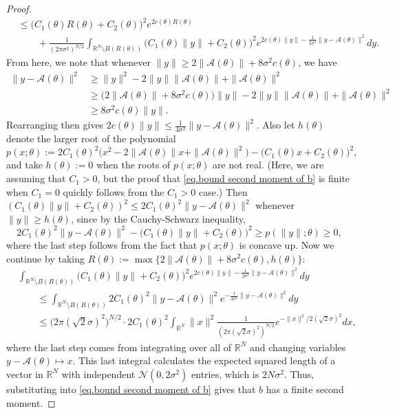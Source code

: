 \documentclass[times,10pt]{elsarticle}
\theoremstyle{plain}
\begin{document}
\begin{proof}
\begin{align}
\nonumber
&\leq \Big(C_1(\theta)R(\theta)+C_2(\theta)\Big)^2e^{2c(\theta)R(\theta)}\\
\label{eq.bound second moment of b}
&\qquad+\frac{1}{(2\pi \sigma^2)^{N/2}}\int_{\mathbb{R}^N\setminus B(R(\theta))}\Big(C_1(\theta)\|y\|+C_2(\theta)\Big)^2e^{2c(\theta)\|y\|-\frac{1}{2\sigma^2}\|y-\mathcal{A}(\theta)\|^2}dy.
\end{align}
From here, we note that whenever $\|y\|\geq 2\|\mathcal{A}(\theta)\|+8\sigma^2c(\theta)$, we have
\begin{align*}
\|y-\mathcal{A}(\theta)\|^2
&\geq\|y\|^2-2\|y\|\|\mathcal{A}(\theta)\|+\|\mathcal{A}(\theta)\|^2\\
&\geq\Big(2\|\mathcal{A}(\theta)\|+8\sigma^2c(\theta)\Big)\|y\|-2\|y\|\|\mathcal{A}(\theta)\|+\|\mathcal{A}(\theta)\|^2\\
&\geq8\sigma^2c(\theta)\|y\|.
\end{align*}
Rearranging then gives $2c(\theta)\|y\|\leq\frac{1}{4\sigma^2}\|y-\mathcal{A}(\theta)\|^2$.
Also let $h(\theta)$ denote the larger root of the polynomial
\begin{equation*}
p(x;\theta):=2C_1(\theta)^2\Big(x^2-2\|\mathcal{A}(\theta)\|x+\|\mathcal{A}(\theta)\|^2\Big)-\Big(C_1(\theta)x+C_2(\theta)\Big)^2,
\end{equation*}
and take $h(\theta):=0$ when the roots of $p(x;\theta)$ are not real.
(Here, we are assuming that $C_1>0$, but the proof that \eqref{eq.bound second moment of b} is finite when $C_1=0$ quickly follows from the $C_1>0$ case.)
Then $(C_1(\theta)\|y\|+C_2(\theta))^2\leq 2C_1(\theta)^2\|y-\mathcal{A}(\theta)\|^2$ whenever $\|y\|\geq h(\theta)$, since by the Cauchy-Schwarz inequality,
\begin{equation*}
2C_1(\theta)^2\|y-\mathcal{A}(\theta)\|^2-\Big(C_1(\theta)\|y\|+C_2(\theta)\Big)^2
\geq p(\|y\|;\theta)
\geq 0,
\end{equation*}
where the last step follows from the fact that $p(x;\theta)$ is concave up.
Now we continue by taking $R(\theta):=\max\{2\|\mathcal{A}(\theta)\|+8\sigma^2c(\theta),h(\theta)\}$:
\begin{align*}
&\int_{\mathbb{R}^N\setminus B(R(\theta))}\Big(C_1(\theta)\|y\|+C_2(\theta)\Big)^2e^{2c(\theta)\|y\|-\frac{1}{2\sigma^2}\|y-\mathcal{A}(\theta)\|^2}dy\\
&\qquad\leq \int_{\mathbb{R}^N\setminus B(R(\theta))}2C_1(\theta)^2\|y-\mathcal{A}(\theta)\|^2e^{-\frac{1}{4\sigma^2}\|y-\mathcal{A}(\theta)\|^2}dy\\
&\qquad\leq \big(2\pi(\sqrt{2}\sigma)^2\big)^{N/2}\cdot2C_1(\theta)^2\int_{\mathbb{R}^N}\|x\|^2\frac{1}{(2\pi(\sqrt{2}\sigma)^2)^{N/2}}e^{-\|x\|^2/2(\sqrt{2}\sigma)^2}dx,
\end{align*}
where the last step comes from integrating over all of $\mathbb{R}^N$ and changing variables $y-\mathcal{A}(\theta)\mapsto x$.
This last integral calculates the expected squared length of a vector in $\mathbb{R}^N$ with independent $\mathcal{N}(0,2\sigma^2)$ entries, which is $2N\sigma^2$.
Thus, substituting into \eqref{eq.bound second moment of b} gives that $b$ has a finite second moment.
\qquad
\end{proof}
\end{document}
